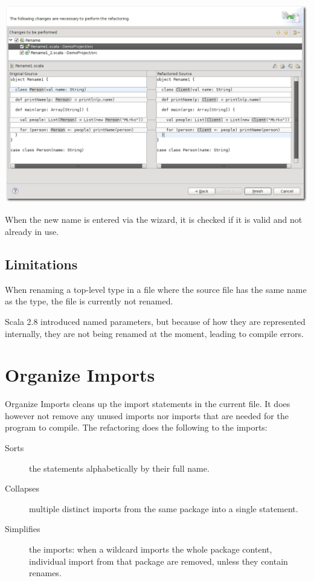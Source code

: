 \documentclass[10pt,a4paper,oneside]{scrreprt}
\begin{document}
\begin{center}
  \includegraphics[width=\linewidth]{rename_screenshot_2.png}
\end{center}

When the new name is entered via the wizard, it is checked if it is valid and not already in use.

\subsection{Limitations}

When renaming a top-level type in a file where the source file has the same name as the type, the file is currently not renamed. 

Scala 2.8 introduced named parameters, but because of how they are represented internally, they are not being renamed at the moment, leading to compile errors.

\section{Organize Imports}

Organize Imports cleans up the import statements in the current file. It does however not remove any unused imports nor imports that are needed for the program to compile. The refactoring does the following to the imports:

\begin{description}
  \item[Sorts] the statements alphabetically by their full name.
  \item[Collapses] multiple distinct imports from the same package into a single statement.
  \item[Simplifies] the imports: when a wildcard imports the whole package content, individual import from that package are removed, unless they contain renames.
\end{description}
\end{document}
